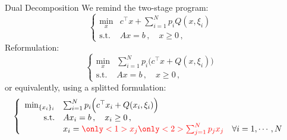 
\begin{frame}{Dual Decomposition}
  We remind the two-stage program:
  \[
    \left\{ \begin{array}{rll}
        \min_x & c^\top x +\sum_{i=1}^N p_i Q(x,\xi_i) &\\
  \mbox{s.t.} & Ax=b\,, \quad x\geq0\,,&
  \end{array} \right.
  \]
  Reformulation:
  \begin{equation*}
    \left\{ \begin{array}{rll}
        \min_x & \sum_{i=1}^N p_i \Big(c^\top x + Q(x,\xi_i)\Big) &\\
  \mbox{s.t.} & Ax=b\,, \quad x\geq0\,,&
  \end{array} \right.
  \end{equation*}
  or equivalently, using a splitted formulation:
  \begin{equation*}
    \left\{ \begin{array}{rll} \min_{\{x_i\}_i} & \sum_{i=1}^N p_i \Big(c^\top x_i + Q(x_i,\xi_i)\Big) &\\
  \mbox{s.t.} & Ax_i=b\,, \quad x_i\geq0\,, \\
              & x_i = \verm{\only<1>{x_j}\only<2>{\sum_{j=1}^N p_j x_j}} \quad \forall i=1, \cdots, N
  \end{array} \right.
  \end{equation*}
\end{frame}

